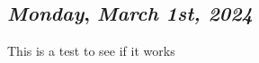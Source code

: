 \begin{center}
\section*{\month}
\end{center}

\def\day{\textit{March 1st, 2024}}
\def\weekday{\textit{Monday}}
\subsection*{\weekday, \day}

This is a test to see if it works